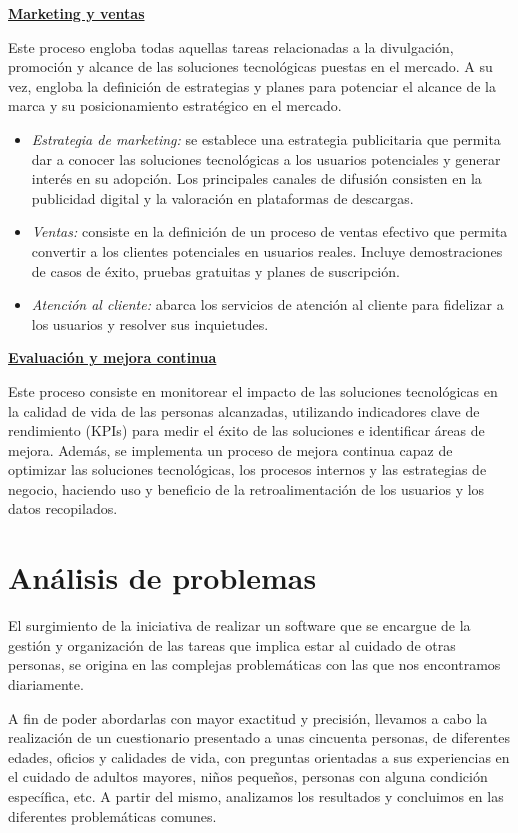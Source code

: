 \documentclass[a4paper,12pt]{article}
\newcommand{\saltolinea}{\par\vspace{\baselineskip}}
\begin{document}
    \noindent \textbf{\underline{Marketing y ventas}}

    Este proceso engloba todas aquellas tareas relacionadas a la divulgación, promoción y alcance de las soluciones tecnológicas puestas en el mercado. A su vez, engloba la definición de estrategias y planes para potenciar el alcance de la marca y su posicionamiento estratégico en el mercado.
    \begin{itemize}
        \item[] \textit{Estrategia de marketing:} se establece una estrategia publicitaria que permita dar a conocer las soluciones tecnológicas a los usuarios potenciales y generar interés en su adopción. Los principales canales de difusión consisten en la publicidad digital y la valoración en plataformas de descargas.
        \item[] \textit{Ventas:} consiste en la definición de un proceso de ventas efectivo que permita convertir a los clientes potenciales en usuarios reales. Incluye demostraciones de casos de éxito, pruebas gratuitas y planes de suscripción.
        \item[] \textit{Atención al cliente:} abarca los servicios de atención al cliente para fidelizar a los usuarios y resolver sus inquietudes.
    \end{itemize}

    \noindent \textbf{\underline{Evaluación y mejora continua}}

    Este proceso consiste en monitorear el impacto de las soluciones tecnológicas en la calidad de vida de las personas alcanzadas, utilizando indicadores clave de rendimiento (KPIs) para medir el éxito de las soluciones e identificar áreas de mejora.
    Además, se implementa un proceso de mejora continua capaz de optimizar las soluciones tecnológicas, los procesos internos y las estrategias de negocio, haciendo uso y beneficio de la retroalimentación de los usuarios y los datos recopilados.

    \newpage

    \section{Análisis de problemas}
    \par El surgimiento de la iniciativa de realizar un software que se encargue de la gestión y organización de las tareas que implica estar al cuidado de otras personas, se origina en las complejas problemáticas con las que nos encontramos diariamente.
    \par A fin de poder abordarlas con mayor exactitud y precisión, llevamos a cabo la realización de un cuestionario presentado a unas cincuenta personas, de diferentes edades, oficios y calidades de vida, con preguntas orientadas a sus experiencias en el cuidado de adultos mayores, niños pequeños, personas con alguna condición específica, etc. A partir del mismo, analizamos los resultados y concluimos en las diferentes problemáticas comunes.
    \saltolinea
\end{document}
